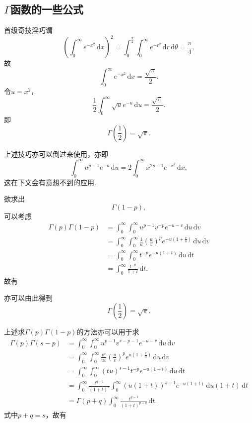 \documentclass[UTF-8]{ctexart}
\newcommand{\dr}{\mathrm{d}}
\newcommand{\pare}[1]{\left(#1\right)}
\newcommand{\half}{\frac{1}{2}}
\newcommand{\intt}[2]{\int_0^\infty #1 \, \dr #2}
\newtheorem{reflection}{反射}
\newcommand{\refl}[1]{\vspace{0.5em}\par\noindent\fbox{%
    \parbox{\textwidth}{%
    \begin{reflection}
        #1
    \end{reflection}
    }%
}\vspace{0.5em}\par}
\begin{document}
  \subsection{$\Gamma$函数的一些公式}
  首级奇技淫巧谓
    \[ \pare{\int_0^\infty e^{-x^2} \, \dr x}^2 = \int_0^\frac{\pi}{2}\int_0^\infty e^{-r^2}\, \dr r \, \dr \theta = \frac{\pi}{4}, \]
  故
  \begin{equation}
    \label{eq:ex2}
    \int_0^\infty e^{-x^2} \, \dr x = \frac{\sqrt{\pi}}{2}.
  \end{equation}
  令$u=x^2$，
  \[ \half \int_0^\infty \sqrt{u}e^{-u} \, \dr u = \frac{\sqrt{\pi}}{2}. \]
  即
  \[ \Gamma\pare{\half} = \sqrt{\pi}. \]
  \par
  上述技巧亦可以倒过来使用，亦即
  \begin{equation}
    \label{eq:ux2}
    \intt{u^{p-1}e^{-u}}{u} = 2\intt{x^{2p-1}e^{-x^2}}{x},
  \end{equation}
  这在下文会有意想不到的应用.
  \par
  欲求出
  \[ \Gamma\pare{1-p}, \]
  可以考虑
  \begin{align*}
    \Gamma\pare{p}\Gamma\pare{1-p} &= \intt{\intt{u^{p-1}v^{-p}e^{-u-v}}{u}}{v}\\
    &=\intt{\intt{\frac{1}{u}\pare{\frac{u}{v}}^p e^{-u\pare{1+\frac{v}{u}}}}{u}}{v}\\
    &=\intt{\intt{t^{-p}e^{-u\pare{1+t}}}{u}}{t}\\
    &=\intt{\frac{t^{-p}}{1+t}}{t}.
  \end{align*}
  故有
  \refl{
  \label{refl:gammarefl}
  \[ \Gamma\pare{p}\Gamma\pare{1-p} = \frac{\pi}{\sin \pi p}. \]}
  亦可以由此得到
  \[ \Gamma\pare{\half} = \sqrt{\pi}. \]
  \par
  上述求$\Gamma\pare{p}\Gamma\pare{1-p}$的方法亦可以用于求
  \begin{align*}
    \Gamma\pare{p}\Gamma\pare{s-p} &= \intt{\intt{u^{p-1}v^{s-p-1}e^{-u-v}}{u}}{v} \\
    &= \intt{\intt{\frac{v^s}{uv}\pare{\frac{u}{v}}^{p}e^{u\pare{1+\frac{v}{u}}}}{u}}{v} \\
    &= \intt{\intt{\pare{tu}^{s-1}t^{-p}e^{-u\pare{1+t}}}{u}}{t} \\
    &= \intt{\frac{t^{q-1}}{\pare{1+t}^s}\intt{\pare{u\pare{1+t}}^{s-1}e^{-u\pare{1+t}}}{u\pare{1+t}}}{t} \\
    & = \Gamma\pare{p+q} \intt{\frac{t^{q-1}}{\pare{1+t}^{p+q}}}{t}.
  \end{align*}
  式中$p+q=s$，故有
  \refl{
  \[ \frac{\Gamma\pare{p}\Gamma\pare{q}}{\Gamma\pare{p+q}} = \intt{\frac{t^{q-1}}{\pare{1+t}^{p+q}}}{t}, \]}
\end{document}
